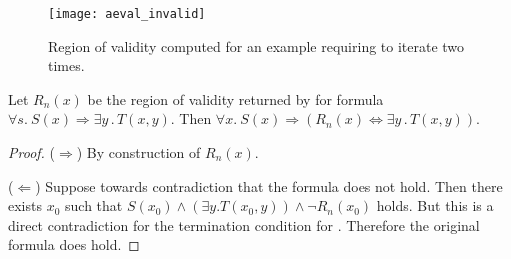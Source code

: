 

\begin{figure}[!t]
\centering
\texttt{[image: aeval\_invalid]}
\caption{Region of validity computed for an example requiring \aeval to iterate two times.}
\label{fg:aeval}
\end{figure}

\begin{lemma}\label{lem:aeval}
  Let $R_n(x)$ be the region of validity returned by \aeval for  formula $\forall
  s.~ S(x) \Rightarrow \exists y\,.\,T(x,y)$. Then
$  \forall x.~ S(x) \Rightarrow (R_n(x) \Leftrightarrow \exists y\,.\,T(x,y))$.
\end{lemma}
\begin{proof}
  ($\Rightarrow$) By construction of $R_n(x)$.

  ($\Leftarrow$) Suppose towards contradiction that the formula does
  not hold. Then there exists $x_0$ such that $S(x_0) \land (\exists
  y. T(x_0, y)) \land \neg R_n(x_0)$ holds. But this is a direct
  contradiction for the termination condition for \aeval. Therefore
  the original formula does hold.
\end{proof}



